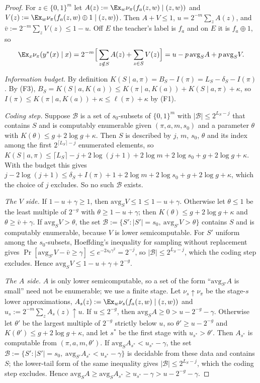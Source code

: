 \begin{proof}
For $z\in\{0,1\}^m$ let $A(z):=\Ex_w\nu_\pi(f_a(z,w)\mid(z,w))$ and $V(z):=\Ex_w\nu_\pi(f_a(z,w)\oplus1\mid(z,w))$. Then $A+V\le1$, $u=2^{-m}\sum_zA(z)$, and $\bar v:=2^{-m}\sum_zV(z)\le1-u$. Off $E$ the teacher's label is $f_a$ and on $E$ it is $f_a\oplus1$, so
\begin{equation}\label{eq:teacher:identity}
\Ex_x\nu_\pi(y^*(x)\mid x)=2^{-m}\Big[\sum_{z\notin S}A(z)+\sum_{z\in S}V(z)\Big]=u-p\,\mathrm{avg}_SA+p\,\mathrm{avg}_SV.
\end{equation}

\emph{Information budget.} By definition $K(S\mid a,\pi)=B_S-I(\pi)=L_S-\delta_S-I(\pi)$. By (F3), $B_S=K(S\mid a,K(a))\le K(\pi\mid a,K(a))+K(S\mid a,\pi)+\kappa$, so $I(\pi)\le K(\pi\mid a,K(a))+\kappa\le\ell(\pi)+\kappa$ by (F1).

\emph{Coding step.} Suppose $\mathcal B$ is a set of $s_0$-subsets of $\{0,1\}^m$ with $|\mathcal B|\le2^{L_S-j}$ that contains $S$ and is computably enumerable given $(\pi,a,m,s_0)$ and a parameter $\theta$ with $K(\theta)\le g+2\log g+\kappa$. Then $S$ is described by $j$, $m$, $s_0$, $\theta$ and its index among the first $2^{\lceil L_S\rceil-j}$ enumerated elements, so $K(S\mid a,\pi)\le\lceil L_S\rceil-j+2\log(j+1)+2\log m+2\log s_0+g+2\log g+\kappa$. With the budget this gives $j-2\log(j+1)\le\delta_S+I(\pi)+1+2\log m+2\log s_0+g+2\log g+\kappa$, which the choice of $j$ excludes. So no such $\mathcal B$ exists.

\emph{The $V$ side.} If $1-u+\gamma\ge1$, then $\mathrm{avg}_SV\le1\le1-u+\gamma$. Otherwise let $\theta\le1$ be the least multiple of $2^{-g}$ with $\theta\ge1-u+\gamma$; then $K(\theta)\le g+2\log g+\kappa$ and $\theta\ge\bar v+\gamma$. If $\mathrm{avg}_SV>\theta$, the set $\mathcal B:=\{S':|S'|=s_0,\ \mathrm{avg}_{S'}V>\theta\}$ contains $S$ and is computably enumerable, because $V$ is lower semicomputable. For $S'$ uniform among the $s_0$-subsets, Hoeffding's inequality for sampling without replacement \citep{hoeffding1963probability} gives $\Pr[\mathrm{avg}_{S'}V-\bar v\ge\gamma]\le e^{-2s_0\gamma^2}=2^{-j}$, so $|\mathcal B|\le2^{L_S-j}$, which the coding step excludes. Hence $\mathrm{avg}_SV\le1-u+\gamma+2^{-g}$.

\emph{The $A$ side.} $A$ is only lower semicomputable, so a set of the form ``$\mathrm{avg}_{S'}A$ is small'' need not be enumerable; we use a finite stage. Let $\nu_s\uparrow\nu_\pi$ be the stage-$s$ lower approximations, $A_s(z):=\Ex_w\nu_s(f_a(z,w)\mid(z,w))$ and $u_s:=2^{-m}\sum_zA_s(z)\uparrow u$. If $u\le2^{-g}$, then $\mathrm{avg}_SA\ge0>u-2^{-g}-\gamma$. Otherwise let $\theta'$ be the largest multiple of $2^{-g}$ strictly below $u$, so $\theta'\ge u-2^{-g}$ and $K(\theta')\le g+2\log g+\kappa$, and let $s^*$ be the first stage with $u_{s^*}>\theta'$. Then $A_{s^*}$ is computable from $(\pi,a,m,\theta')$. If $\mathrm{avg}_SA_{s^*}<u_{s^*}-\gamma$, the set $\mathcal B:=\{S':|S'|=s_0,\ \mathrm{avg}_{S'}A_{s^*}<u_{s^*}-\gamma\}$ is decidable from these data and contains $S$; the lower-tail form of the same inequality gives $|\mathcal B|\le2^{L_S-j}$, which the coding step excludes. Hence $\mathrm{avg}_SA\ge\mathrm{avg}_SA_{s^*}\ge u_{s^*}-\gamma>u-2^{-g}-\gamma$.


\end{proof}
